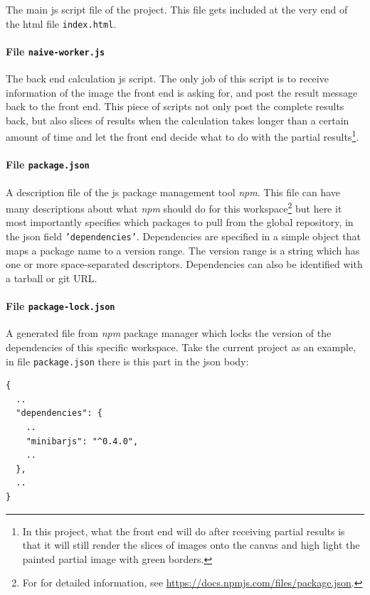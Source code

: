 The main \gls{js} script file of the project. This file gets included at the very end of the \gls{html} file \texttt{index.html}.

\paragraph{File \texttt{naive-worker.js}}

The back end calculation \gls{js} script. The only job of this script is to receive information of the image the front end is asking for, and post the result message back to the front end. This piece of scripts not only post the complete results back, but also slices of results when the calculation takes longer than a certain amount of time and let the front end decide what to do with the partial results\footnote{ In this project, what the front end will do after receiving partial results is that it will still render the slices of images onto the canvas and high light the painted partial image with green borders. }.

\paragraph{File \texttt{package.json}}

A description file of the \gls{js} package management tool \emph{npm}. This file can have many descriptions about what \emph{npm} should do for this workspace\footnote{ For for detailed information, see \url{https://docs.npmjs.com/files/package.json}.} but here it most importantly specifies which packages to pull from the global repository, in the \gls{json} field \texttt{'dependencies'}. Dependencies are specified in a simple object that maps a package name to a version range. The version range is a string which has one or more space-separated descriptors. Dependencies can also be identified with a tarball or git URL\cite{bib:npm:packagejson}.

\paragraph{File \texttt{package-lock.json}}

A generated file from \emph{npm} package manager which locks the version of the dependencies of this specific workspace. Take the current project as an example, in file \texttt{package.json} there is this part in the \gls{json} body:

\begin{verbatim}
{
  ..
  "dependencies": {
    ..
    "minibarjs": "^0.4.0",
    ..
  },
  ..
}
\end{verbatim}

